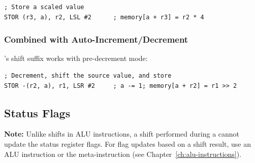 \begin{lstlisting}
; Store a scaled value
STOR (r3, a), r2, LSL #2      ; memory[a + r3] = r2 * 4
\end{lstlisting}

\subsubsection{Combined with Auto-Increment/Decrement}

's shift suffix works with pre-decrement mode:

\begin{lstlisting}
; Decrement, shift the source value, and store
STOR -(r2, a), r1, LSR #2     ; a -= 1; memory[a + r2] = r1 >> 2
\end{lstlisting}

\subsection{Status Flags}

\textbf{Note:} Unlike shifts in ALU instructions, a shift performed during a  cannot update the status
register flags. For flag updates based on a shift result, use an ALU instruction or the 
meta-instruction (see Chapter~\ref{ch:alu-instructions}).
